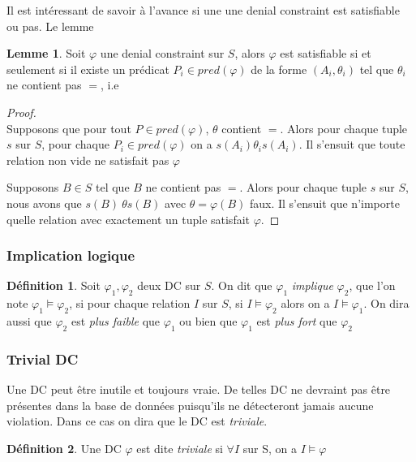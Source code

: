 \documentclass[letterpaper, 12pt]{report}
\theoremstyle{definition}
\newtheorem{mydef}{Définition}
\newtheorem{mylemma}{Lemme}
\newcommand{\alinea}{
\hspace*{0.5cm}}
\begin{document}
Il est intéressant de savoir à l'avance si une une denial constraint est satisfiable ou pas. Le lemme 

\begin{mylemma}\label{satisLemma}
	Soit $\varphi$ une denial constraint sur $S$, alors $\varphi$ est satisfiable si et seulement si il existe un prédicat $P_i \in pred (\varphi)$ de la forme $(A_i,\theta_i)$ tel que $\theta_i$ ne contient pas $=$, i.e
\end{mylemma}
\begin{proof}~\\
\alinea \framebox{$\implies$} Supposons que pour tout $P \in pred(\varphi)$, $\theta$ contient $=$. Alors pour chaque tuple $s$ sur $S$, pour chaque $P_i \in pred(\varphi)$ on a $s(A_i) \theta_i s(A_i)$. Il s'ensuit que toute relation non vide ne satisfait pas $\varphi$

\framebox{$\impliedby$} Supposons $B \in S$ tel que $B$ ne contient pas $=$. Alors pour chaque tuple $s$ sur $S$, nous avons que $s(B)\ \theta s(B)$ avec $\theta=\varphi(B)$ faux. Il s'ensuit que n'importe quelle relation avec exactement un tuple satisfait $\varphi$.

\end{proof}


\subsubsection{Implication logique}

\begin{mydef}
Soit $\varphi_1,\varphi_2$ deux DC sur $S$. On dit que $\varphi_1$ \emph{implique} $\varphi_2$, que l'on note $\varphi_1 \models\varphi_2$, si pour chaque relation $I$ sur $S$, si $I \models \varphi_2$ alors on a $I \models \varphi_1$. On dira aussi que $\varphi_2$ est \emph{plus faible} que $\varphi_1$ ou bien que $\varphi_1$ est \emph{plus fort} que $\varphi_2$
\end{mydef}

\subsubsection{Trivial DC}

Une DC peut être inutile et toujours vraie. De telles DC ne devraint pas être présentes dans la base de données puisqu'ils ne détecteront jamais aucune violation. Dans ce cas on dira que le DC est \emph{triviale}. 
\begin{mydef}
	Une DC $\varphi$ est dite \emph{triviale} si $\forall I$ sur S, on a $I \models \varphi$
\end{mydef}
\end{document}
